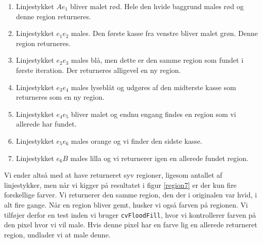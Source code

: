 {\begin{enumerate}
    \item Linjestykket $Ae_1$ bliver malet rød. Hele den hvide baggrund
        males rød og denne region returneres.
    \item Linjestykket $e_1e_2$ males. Den første kasse fra venstre
        bliver malet grøn. Denne region returneres.
    \item Linjestykket $e_2e_3$ males blå, men dette er den samme region som
        fundet i første iteration. Der returneres alligevel en ny
        region.
    \item Linjestykket $e_3e_4$ males lyseblåt og udgøres af den
        midterste kasse som returneres som en ny region.
    \item Linjestykket $e_4e_5$ bliver malet og endnu engang findes en
        region som vi allerede har fundet.
    \item Linjestykket $e_5e_6$ males orange og vi finder den sidste
        kasse.
    \item Linjestykket $e_6B$ males lilla og vi returnerer igen en
        allerede fundet region.
\end{enumerate}
Vi ender altså med at have returneret syv regioner, ligesom antallet af
linjestykker, men når vi kigger på resultatet i figur \ref{region7} er
der kun fire forskellige farver. Vi returnerer den samme region, den der
i originalen var hvid, i alt fire gange. Når en region bliver gemt,
husker vi også farven på regionen. Vi tilføjer derfor en test inden vi
bruger \texttt{cvFloodFill}, hvor vi kontrollerer farven på den pixel
hvor vi vil male. Hvis denne pixel har en farve lig en allerede
returneret region, undlader vi at male denne.


}
